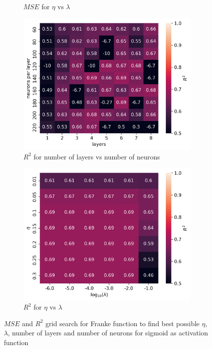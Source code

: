 \documentclass[11pt]{article}
\begin{document}
\begin{figure}[H]
\begin{subfigure}{.5\textwidth}
    \caption{$MSE$ for $\eta$ vs $\lambda$}
    \label{fig:}
  \end{subfigure}
  \begin{subfigure}{.5\textwidth}
    \centering
    \includegraphics[width=\textwidth]{../figures/franke_L_n_test_sigmoid_R2.png}
    \caption{$R^2$ for number of layers vs number of neurons}
    \label{fig:}
  \end{subfigure}
  \begin{subfigure}{.5\textwidth}
    \centering
    \includegraphics[width=\textwidth]{../figures/franke_eta_lmb_sigmoid_R2.png}
    \caption{$R^2$ for $\eta$ vs $\lambda$}
    \label{fig:}
  \end{subfigure}
  \caption{$MSE$ and $R^2$ grid search for Franke function to find best possible $\eta$, $\lambda$, number of layers and number of neurons for sigmoid as activation function}
  \label{fig:franke_grid}
\end{figure}
\end{document}
